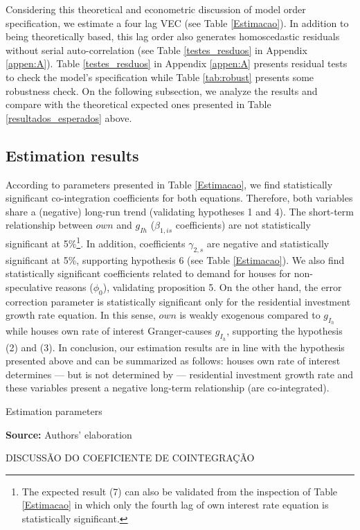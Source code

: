 \documentclass[12pt, a4paper]{article}
\begin{document}
Considering this theoretical and econometric discussion of model order specification, we estimate a four lag VEC  (see Table \ref{Estimacao}).
In addition to being theoretically based, this lag order also generates homoscedastic residuals without serial auto-correlation (see Table \ref{testes_resduos} in Appendix \ref{appen:A}).
Table \ref{testes_resduos} in Appendix \ref{appen:A} presents residual tests to check the model's specification while Table \ref{tab:robust} presents some robustness check.
On the following subsection, we analyze the results and compare with the theoretical expected ones presented in Table \ref{resultados_esperados} above.  




\subsection{Estimation results}
\label{sec:org1d500cf}
\label{sec:results}

According to parameters presented in Table \ref{Estimacao}, we find statistically significant co-integration  coefficients for both equations. 
Therefore, both variables share a (negative) long-run trend (validating hypotheses 1 and 4).
The short-term relationship between \(own\) and \(g_{Ih}\) (\(\beta_{1, is}\) coefficients) are not statistically significant at 5\%\footnote{The expected result (7) can also be validated from the inspection of Table \ref{Estimacao} in which only the fourth lag of own interest rate equation is statistically significant.}.
In addition, coefficients \(\gamma_{2,s}\) are negative and statistically significant at 5\%, supporting hypothesis 6 (see Table  \ref{Estimacao}).
We also find statistically significant coefficients related to demand for houses for non-speculative reasons (\(\phi_0\)), validating proposition 5.
On the other hand, the error correction parameter is statistically significant only for the residential investment growth rate equation.
In this sense, \(own\) is weakly exogenous compared to \(g_{I_h}\) while houses own rate of interest Granger-causes \(g_{I_h}\), supporting the hypothesis (2) and (3).
In conclusion, our estimation results are in line with the hypothesis presented above and can be summarized as follows: houses own rate of interest determines --- but is not determined by --- residential investment growth rate and these variables present a negative long-term relationship (are co-integrated).

\begin{table}[h!]
	\caption{Estimation parameters}
	\centering
	
	\caption*{\textbf{Source:} Authors' elaboration}
\end{table}
DISCUSSÃO DO COEFICIENTE DE COINTEGRAÇÃO
\end{document}
